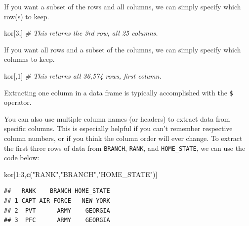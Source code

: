 \documentclass[]{book}
\newenvironment{Shaded}{\begin{snugshade}}{\end{snugshade}}
\newcommand{\KeywordTok}[1]{\textcolor[rgb]{0.13,0.29,0.53}{\textbf{{#1}}}}
\newcommand{\DecValTok}[1]{\textcolor[rgb]{0.00,0.00,0.81}{{#1}}}
\newcommand{\StringTok}[1]{\textcolor[rgb]{0.31,0.60,0.02}{{#1}}}
\newcommand{\CommentTok}[1]{\textcolor[rgb]{0.56,0.35,0.01}{\textit{{#1}}}}
\newcommand{\NormalTok}[1]{{#1}}
\begin{document}
If you want a subset of the rows and all columns, we can simply specify
which row(s) to keep.

\begin{Shaded}
\begin{Highlighting}[]
\NormalTok{kor[}\DecValTok{3}\NormalTok{,] }\CommentTok{# This returns the 3rd row, all 25 columns.}
\end{Highlighting}
\end{Shaded}

If you want all rows and a subset of the columns, we can simply specify
which columns to keep.

\begin{Shaded}
\begin{Highlighting}[]
\NormalTok{kor[,}\DecValTok{1}\NormalTok{] }\CommentTok{# This returns all 36,574 rows, first column.}
\end{Highlighting}
\end{Shaded}

Extracting one column in a data frame is typically accomplished with the
\texttt{\$} operator.

\begin{Shaded}
\end{Shaded}

You can also use multiple column names (or headers) to extract data from
specific columns. This is especially helpful if you can't remember
respective column numbers, or if you think the column order will ever
change. To extract the first three rows of data from \texttt{BRANCH},
\texttt{RANK}, and \texttt{HOME\_STATE}, we can use the code below:

\begin{Shaded}
\begin{Highlighting}[]
\NormalTok{kor[}\DecValTok{1}\NormalTok{:}\DecValTok{3}\NormalTok{,}\KeywordTok{c}\NormalTok{(}\StringTok{"RANK"}\NormalTok{,}\StringTok{"BRANCH"}\NormalTok{,}\StringTok{"HOME_STATE"}\NormalTok{)]}
\end{Highlighting}
\end{Shaded}

\begin{verbatim}
##   RANK    BRANCH HOME_STATE
## 1 CAPT AIR FORCE   NEW YORK
## 2  PVT      ARMY    GEORGIA
## 3  PFC      ARMY    GEORGIA
\end{verbatim}
\end{document}
